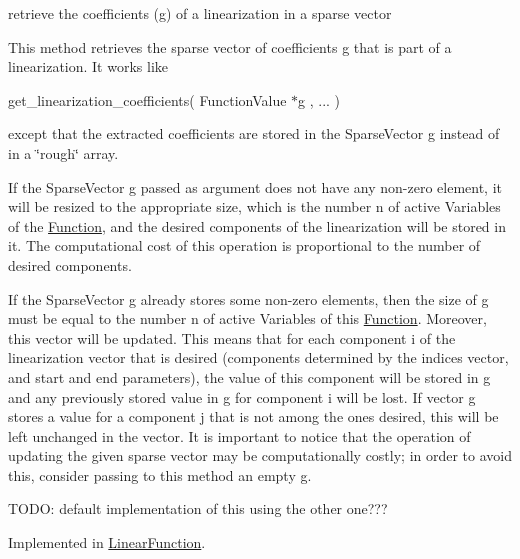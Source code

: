 retrieve the coefficients (g) of a linearization in a sparse vector 

This method retrieves the sparse vector of coefficients g that is part of a linearization. It works like

get\+\_\+linearization\+\_\+coefficients( Function\+Value $\ast$g , ... )

except that the extracted coefficients are stored in the Sparse\+Vector g instead of in a \char`\"{}rough\char`\"{} array.

If the Sparse\+Vector g passed as argument does not have any non-\/zero element, it will be resized to the appropriate size, which is the number n of active Variables of the \mbox{\hyperlink{class_s_m_spp__di__unipi__it_1_1_function}{Function}}, and the desired components of the linearization will be stored in it. The computational cost of this operation is proportional to the number of desired components.

If the Sparse\+Vector g already stores some non-\/zero elements, then the size of g must be equal to the number n of active Variables of this \mbox{\hyperlink{class_s_m_spp__di__unipi__it_1_1_function}{Function}}. Moreover, this vector will be updated. This means that for each component i of the linearization vector that is desired (components determined by the indices vector, and start and end parameters), the value of this component will be stored in g and any previously stored value in g for component i will be lost. If vector g stores a value for a component j that is not among the ones desired, this will be left unchanged in the vector. It is important to notice that the operation of updating the given sparse vector may be computationally costly; in order to avoid this, consider passing to this method an empty g.

T\+O\+DO\+: default implementation of this using the other one??? 

Implemented in \mbox{\hyperlink{class_s_m_spp__di__unipi__it_1_1_linear_function_aae9db96155b8cfd53076622b83922cd0}{Linear\+Function}}.

\mbox{\label{class_s_m_spp__di__unipi__it_1_1_c05_function_a3dd9dea6fa3125e0c45acb5fc28955f8}} 
